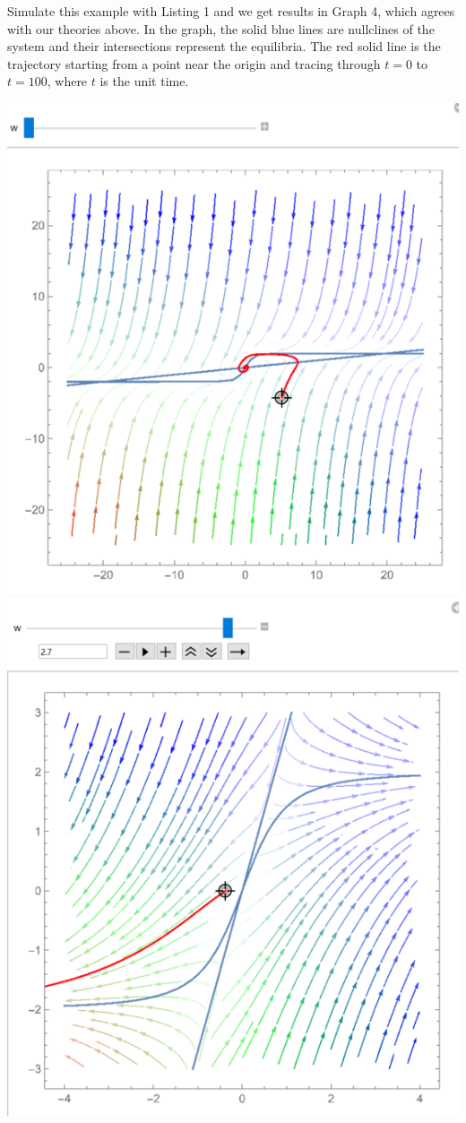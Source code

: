 \documentclass[12pt]{article}
\begin{document}
  Simulate this example with Listing 1 and we get results in Graph 4, which agrees with our theories above. In the graph, the solid blue lines are nullclines of the system and their intersections represent the equilibria. The red solid line is the trajectory starting from a point near the origin and tracing through $t=0$ to $t=100$, where $t$ is the unit time.

\begin{center}
  \includegraphics[scale=0.3]{ StabilitySketch00.png}
  \includegraphics[scale=0.3]{ StabilitySketch01.png}

\end{center}
\end{document}

